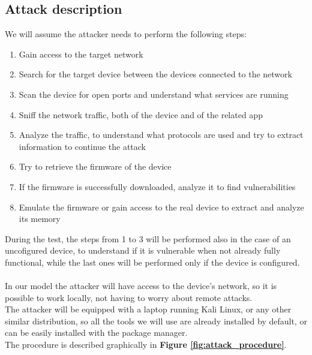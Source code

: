\subsection{Attack description}
We will assume the attacker needs to perform the following steps:
\begin{enumerate}
    \item Gain access to the target network
    \item Search for the target device between the devices connected to the network
    \item Scan the device for open ports and understand what services are running
    \item Sniff the network traffic, both of the device and of the related app
    \item Analyze the traffic, to understand what protocols are used and try to
          extract information to continue the attack
    \item Try to retrieve the firmware of the device
    \item If the firmware is successfully downloaded, analyze it to find vulnerabilities
    \item Emulate the firmware or gain access to the real device to extract and
            analyze its memory
\end{enumerate}
During the test, the steps from 1 to 3 will be performed also in the
case of an uncofigured device, to understand if it is vulnerable
when not already fully functional, while the last ones will be performed only
if the device is configured.\\\\
In our model the attacker will have access to the device's network, so it is
possible to work locally, not having to worry about remote attacks.\\
The attacker will be equipped with a laptop running Kali Linux, or any other
similar distribution, so all the tools we will use are already installed by default,
or can be easily installed with the package manager.\\
The procedure is described graphically in \textbf{Figure \ref{fig:attack_procedure}}.
\newpage

